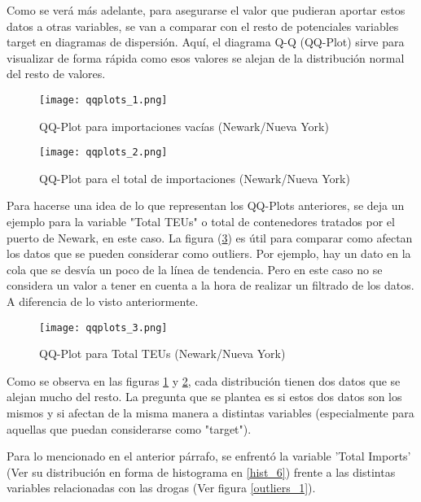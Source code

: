 \documentclass[12pt]{article}
\begin{document}
		Como se verá más adelante, para asegurarse el valor que pudieran aportar estos datos a otras variables, se van a comparar con el resto de potenciales variables target en diagramas de dispersión. Aquí, el diagrama Q-Q (QQ-Plot) sirve para visualizar de forma rápida como esos valores se alejan de la distribución normal del resto de valores.
		
		\begin{figure}[H]
			\caption{\label{qqplots_1} QQ-Plot para importaciones vacías (Newark/Nueva York)}
			\centering
			\hspace*{1cm}
			\texttt{[image: qqplots\_1.png]}
		\end{figure}
	
		\begin{figure}[H]
			\caption{\label{qqplots_2} QQ-Plot para el total de importaciones (Newark/Nueva York)}
			\centering
			\hspace*{1cm}
			\texttt{[image: qqplots\_2.png]}
		\end{figure}
	
		Para hacerse una idea de lo que representan los QQ-Plots anteriores, se deja un ejemplo para la variable "Total TEUs" o total de contenedores tratados por el puerto de Newark, en este caso. La figura (\ref{qqplots_3}) es útil para comparar como afectan los datos que se pueden considerar como outliers. Por ejemplo, hay un dato en la cola que se desvía un poco de la línea de tendencia. Pero en este caso no se considera un valor a tener en cuenta a la hora de realizar un filtrado de los datos. A diferencia de lo visto anteriormente.
		
		\begin{figure}[H]
			\caption{\label{qqplots_3} QQ-Plot para Total TEUs (Newark/Nueva York)}
			\centering
			\hspace*{1cm}
			\texttt{[image: qqplots\_3.png]}
		\end{figure}
	
		Como se observa en las figuras \ref{qqplots_1} y \ref{qqplots_2}, cada distribución tienen dos datos que se alejan mucho del resto. La pregunta que se plantea es si estos dos datos son los mismos y si afectan de la misma manera a distintas variables (especialmente para aquellas que puedan considerarse como "target").
		
		Para lo mencionado en el anterior párrafo, se enfrentó la variable 'Total Imports' (Ver su distribución en forma de histograma en \ref{hist_6}) frente a las distintas variables relacionadas con las drogas (Ver figura \ref{outliers_1}). 
		
\end{document}

